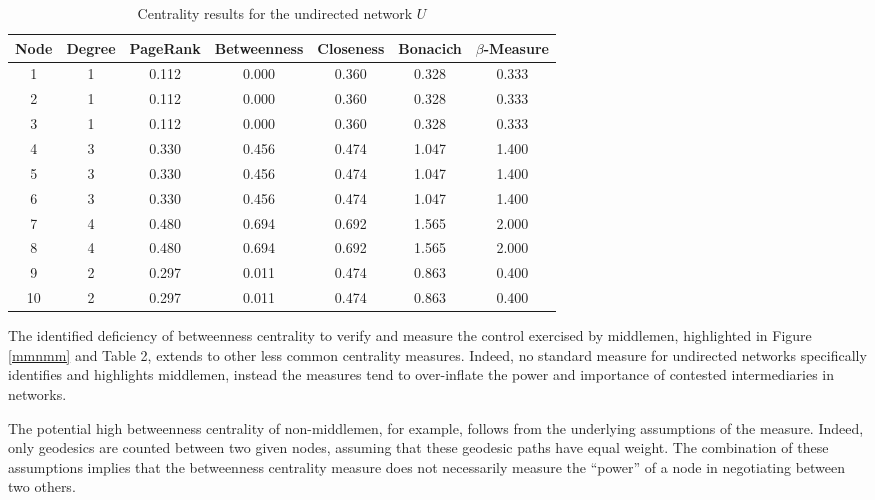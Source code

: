 \begin{table}[h]
\begin{center}
\begin{tabular}{ccccccc}
\hline \hline
Node & Degree 	& PageRank	& Betweenness 	& Closeness 	& Bonacich 	& $\beta$-Measure \\
\hline
1    & 1    	& 0.112 	& 0.000    		& 0.360  		& 0.328 	& 0.333\\
2    & 1    	& 0.112 	& 0.000    		& 0.360  		& 0.328 	& 0.333\\
3    & 1    	& 0.112 	& 0.000    		& 0.360  		& 0.328 	& 0.333\\
4    & 3    	& 0.330 	& 0.456    		& 0.474  		& 1.047 	& 1.400\\
5    & 3    	& 0.330 	& 0.456    		& 0.474  		& 1.047 	& 1.400\\
6    & 3    	& 0.330 	& 0.456    		& 0.474  		& 1.047 	& 1.400\\
7    & 4    	& 0.480 	& 0.694    		& 0.692  		& 1.565 	& 2.000\\
8    & 4    	& 0.480 	& 0.694    		& 0.692  		& 1.565 	& 2.000\\
9    & 2    	& 0.297 	& 0.011    		& 0.474  		& 0.863 	& 0.400\\
10   & 2    	& 0.297 	& 0.011    		& 0.474  		& 0.863 	& 0.400\\
\hline \hline
\end{tabular}
\caption{Centrality results for the undirected network $U$}
\end{center}
\end{table}

\noindent
The identified deficiency of betweenness centrality to verify and measure the control exercised by middlemen, highlighted in Figure \ref{mmnmm} and Table 2, extends to other less common centrality measures. Indeed, no standard measure for undirected networks specifically identifies and highlights middlemen, instead the measures tend to over-inflate the power and importance of contested intermediaries in networks.

The potential high betweenness centrality of non-middlemen, for example, follows from the underlying assumptions of the measure. Indeed, only geodesics are counted between two given nodes, assuming that these geodesic paths have equal weight. The combination of these assumptions implies that the betweenness centrality measure does not necessarily measure the ``power'' of a node in negotiating between two others.



